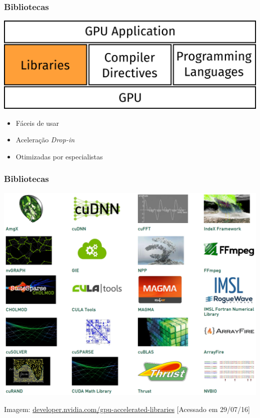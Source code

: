 \documentclass[10pt, compress]{beamer}
\begin{document}
\begin{frame}
    \frametitle{Bibliotecas}
    \begin{center}
        \includegraphics[width=.6\textwidth]{accel_apps_lib}
    \end{center}
    \pause

    \begin{itemize}
        \item Fáceis de usar
            \pause
        \item Aceleração \textit{Drop-in}
            \pause
        \item Otimizadas por especialistas
    \end{itemize}
\end{frame}

\begin{frame}
    \frametitle{Bibliotecas}
    \centering
    \includegraphics[width=.9\textwidth]{accel_libs_no}
    \vfill

    \tiny{Imagem: \url{developer.nvidia.com/gpu-accelerated-libraries} [Acessado em 29/07/16]}
\end{frame}
\end{document}
